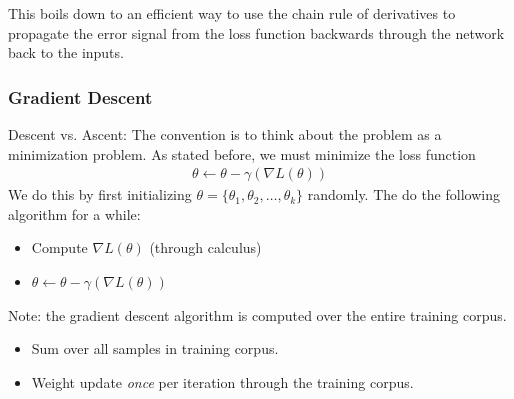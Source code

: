\documentclass{article}
\begin{document}
This boils down to an efficient way to use the chain rule of derivatives to propagate the error signal from the loss function backwards through the network back to the inputs.
\subsubsection{Gradient Descent}
Descent vs. Ascent: The convention is to think about the problem as a minimization problem. As stated before, we must minimize the loss function
\begin{align}
    \theta \leftarrow \theta - \gamma(\nabla L(\theta))
\end{align}
We do this by first initializing $\theta = \{\theta_1, \theta_2, \ldots, \theta_k\}$ randomly. The do the following algorithm for a while:
\begin{itemize}
    \item Compute $\nabla L(\theta)$ (through calculus)
    \item $\theta \leftarrow \theta - \gamma(\nabla L(\theta))$
\end{itemize}
Note: the gradient descent algorithm is computed over the entire training corpus.
\begin{itemize}
    \item Sum over all samples in training corpus.
    \item Weight update \textit{once} per iteration through the training corpus.
\end{itemize}
\end{document}
